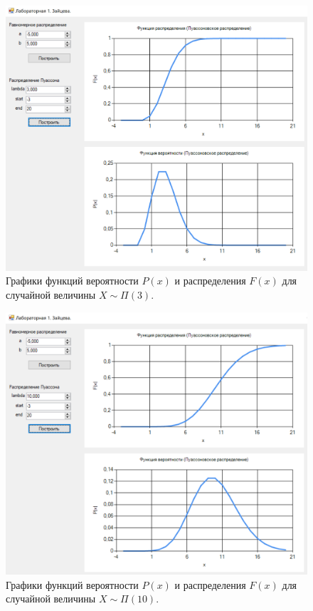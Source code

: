 \documentclass[14pt, a4paper]{extarticle}
\begin{document}
\clearpage
\begin{figure}[h!]
	\begin{center}
		\includegraphics[scale=0.7]{pictures/p2.png}
	\end{center}
	\captionsetup{justification=centering}
	\caption{Графики функций вероятности $P(x)$ и распределения $F(x)$ для случайной величины $X \sim \Pi(3)$.}
	\label{fig:p2}
\end{figure}

\clearpage
\begin{figure}[h!]
	\begin{center}
		\includegraphics[scale=0.7]{pictures/p3.png}
	\end{center}
	\captionsetup{justification=centering}
	\caption{Графики функций вероятности $P(x)$ и распределения $F(x)$ для случайной величины $X \sim \Pi(10)$.}
	\label{fig:p3}
\end{figure}
\end{document}
